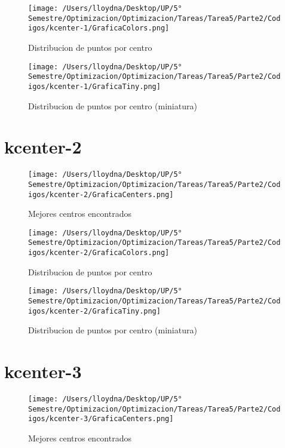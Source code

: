 \documentclass{report}
\begin{document}
        \begin{figure}[H]
            \texttt{[image: /Users/lloydna/Desktop/UP/5° Semestre/Optimizacion/Optimizacion/Tareas/Tarea5/Parte2/Codigos/kcenter-1/GraficaColors.png]}
            \caption{Distribucion de puntos por centro}
            \label{fig:kc12}
        \end{figure}

        \begin{figure}[H]
            \texttt{[image: /Users/lloydna/Desktop/UP/5° Semestre/Optimizacion/Optimizacion/Tareas/Tarea5/Parte2/Codigos/kcenter-1/GraficaTiny.png]}
            \caption{Distribucion de puntos por centro (miniatura)}
            \label{fig:kc13}
        \end{figure}

    \pagebreak

    \section{kcenter-2}
        \begin{figure}[H]
            \texttt{[image: /Users/lloydna/Desktop/UP/5° Semestre/Optimizacion/Optimizacion/Tareas/Tarea5/Parte2/Codigos/kcenter-2/GraficaCenters.png]}
            \caption{Mejores centros encontrados}
            \label{fig:kc21}
        \end{figure}

        \begin{figure}[H]
            \texttt{[image: /Users/lloydna/Desktop/UP/5° Semestre/Optimizacion/Optimizacion/Tareas/Tarea5/Parte2/Codigos/kcenter-2/GraficaColors.png]}
            \caption{Distribucion de puntos por centro}
            \label{fig:kc22}
        \end{figure}

        \begin{figure}[H]
            \texttt{[image: /Users/lloydna/Desktop/UP/5° Semestre/Optimizacion/Optimizacion/Tareas/Tarea5/Parte2/Codigos/kcenter-2/GraficaTiny.png]}
            \caption{Distribucion de puntos por centro (miniatura)}
            \label{fig:kc23}
        \end{figure}

    \pagebreak

    \section{kcenter-3}
        \begin{figure}[H]
            \texttt{[image: /Users/lloydna/Desktop/UP/5° Semestre/Optimizacion/Optimizacion/Tareas/Tarea5/Parte2/Codigos/kcenter-3/GraficaCenters.png]}
            \caption{Mejores centros encontrados}
            \label{fig:kc31}
        \end{figure}
\end{document}

